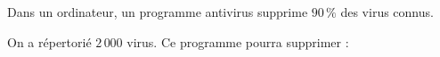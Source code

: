 
Dans un ordinateur, un programme antivirus supprime $90\,\%$ des virus connus.

On a répertorié $2\,000$ virus. Ce programme pourra supprimer :

\smallskip
{}
